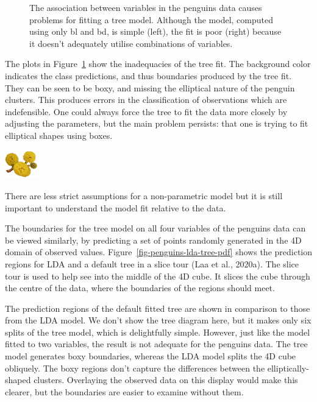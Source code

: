 \documentclass[
  letterpaper,
]{krantz}
\newcommand{\infobox}[1]{%
\noindent\colorbox{info!30}{%
\begin{minipage}{0.98\linewidth}%
    \centering%
    \begin{minipage}[c]{0.15\linewidth} %
      \includegraphics[width=1.5cm]{images/mulga-flowers2.png} %
    \end{minipage}%
    \hfill %
    \begin{minipage}[c]{0.8\linewidth} %
      \bigskip%
      \textsf{#1}%
      \bigskip%
    \end{minipage}%
    \hspace*{3mm}%
  \end{minipage}%
}%
}
\begin{document}
\begin{figure}


\caption{\label{fig-p-bl-bd-tree}The association between variables in
the penguins data causes problems for fitting a tree model. Although the
model, computed using only bl and bd, is simple (left), the fit is poor
(right) because it doesn't adequately utilise combinations of
variables.}

\end{figure}%

The plots in Figure~\ref{fig-p-bl-bd-tree} show the inadequacies of the
tree fit. The background color indicates the class predictions, and thus
boundaries produced by the tree fit. They can be seen to be boxy, and
missing the elliptical nature of the penguin clusters. This produces
errors in the classification of observations which are indefensible. One
could always force the tree to fit the data more closely by adjusting
the parameters, but the main problem persists: that one is trying to fit
elliptical shapes using boxes.

\infobox{There are less strict assumptions for a non-parametric model but it is still important to understand the model fit relative to the data. 
}

The boundaries for the tree model on all four variables of the penguins
data can be viewed similarly, by predicting a set of points randomly
generated in the 4D domain of observed values.
Figure~\ref{fig-penguins-lda-tree-pdf} shows the prediction regions for
LDA and a default tree in a slice tour (Laa et al., 2020a). The slice
tour is used to help see into the middle of the 4D cube. It slices the
cube through the centre of the data, where the boundaries of the regions
should meet.

The prediction regions of the default fitted tree are shown in
comparison to those from the LDA model. We don't show the tree diagram
here, but it makes only six splits of the tree model, which is
delightfully simple. However, just like the model fitted to two
variables, the result is not adequate for the penguins data. The tree
model generates boxy boundaries, whereas the LDA model splits the 4D
cube obliquely. The boxy regions don't capture the differences between
the elliptically-shaped clusters. Overlaying the observed data on this
display would make this clearer, but the boundaries are easier to
examine without them.
\end{document}
